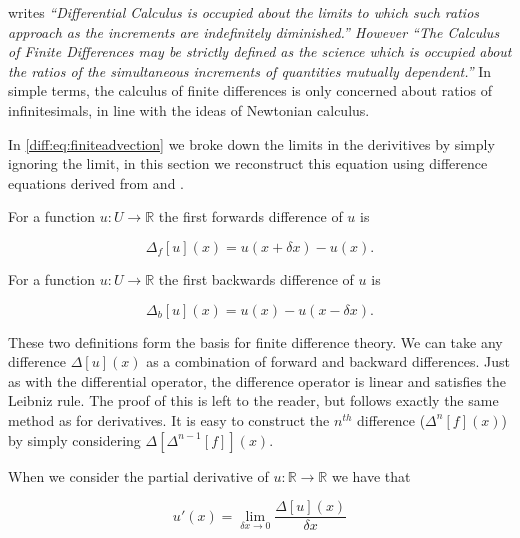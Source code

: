 \documentclass[../main.tex]{subfiles}
\begin{document}
  \cite{boole1880} writes \emph{``Differential Calculus is occupied about the limits to which such ratios approach as the increments are indefinitely diminished.'' However ``The Calculus of Finite Differences may be strictly defined as the science which is occupied about the ratios of the simultaneous increments of quantities mutually dependent.''} In simple terms, the calculus of finite differences is only concerned about ratios of infinitesimals, in line with the ideas of Newtonian calculus.

  In \autoref{diff:eq:finiteadvection} we broke down the limits in the derivitives by simply ignoring the limit, in this section we reconstruct this equation using difference equations derived from \cite{boole1880} and \cite{hildebrand1987}.

  \begin{definition}
    For a function $u: U \to \mathbb{R}$ the first forwards difference of $u$ is

    \begin{equation}
      \Delta_f[u](x) = u(x + \delta x) - u(x).
    \end{equation}
  \end{definition}

  \begin{definition}
    For a function $u: U \to \mathbb{R}$ the first backwards difference of $u$ is

    \begin{equation}
      \Delta_b[u](x) = u(x) - u(x - \delta x).
    \end{equation}
  \end{definition}

  These two definitions form the basis for finite difference theory. We can take any difference $\Delta[u](x)$ as a combination of forward and backward differences. Just as with the differential operator, the difference operator is linear and satisfies the Leibniz rule. The proof of this is left to the reader, but follows exactly the same method as for derivatives. It is easy to construct the $n^{th}$ difference ($\Delta ^n[f](x)$) by simply considering $\Delta [\Delta ^{n-1}[f]](x)$.

  When we consider the partial derivative of $u: \mathbb{R} \to \mathbb{R}$ we have that

  \begin{equation}
    u'(x) = \lim_{\delta x \to 0} \frac{\Delta[u](x)}{\delta x}
  \end{equation}
\end{document}
